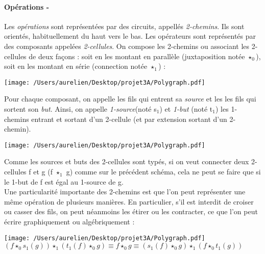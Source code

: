 \documentclass[a4paper,11pt,titlepage]{article}
\newcommand\insPolygraphPDF[1]{\texttt{[image: /Users/aurelien/Desktop/projet3A/Polygraph.pdf]}}
\begin{document}
\paragraph{Op\'{e}rations -}
Les \textit{op\'{e}rations} sont repr\'{e}sent\'{e}es par des circuits, appell\'{e}s \textit{2-chemins}. Ils sont orient\'{e}s, habituellement du haut vers le bas. Les op\'{e}rateurs sont repr\'{e}sent\'{e}s par des composants appel\'{e}es \textit{2-cellules}. On compose les 2-chemins ou associant les 2-cellules de deux fa\c{c}ons : soit en les montant en parall\`{e}le (juxtaposition not\'{e}e $\star_{0}$), soit en les montant en s\'{e}rie (connection not\'{e}e $\star_{1}$) : 
\begin{center}\insPolygraphPDF{2}\end{center}
Pour chaque composant, on appelle les fils qui entrent sa \textit{source} et les les fils qui sortent son \textit{but}. Ainsi, on appelle \textit{1-source}(not\'{e} s$_{1}$) et \textit{1-but} (not\'{e} t$_{1}$) les 1-chemins  entrant et sortant d'un 2-cellule (et par extension sortant d'un 2-chemin).
\begin{center}\insPolygraphPDF{4}\end{center}
Comme les sources et buts des 2-cellules sont typ\'{e}s, si on veut connecter deux 2-cellules f et g (f $\star_{1}$ g) comme sur le pr\'{e}c\'{e}dent sch\'{e}ma, cela ne peut se faire que si le 1-but de f est \'{e}gal au 1-source de g.
\\Une particularit\'{e} importante des 2-chemins est que l'on peut repr\'{e}senter une m\^{e}me op\'{e}ration de plusieurs mani\`{e}res. En particulier, s'il est interdit de croiser ou casser des fils, on peut n\'{e}anmoins les \'{e}tirer ou les contracter, ce que l'on peut \'{e}crire graphiquement ou alg\'{e}briquement :
\begin{center}\insPolygraphPDF{3}
$(f \star_{0} s_{1}(g)) \star_{1} (t_{1}(f) \star_{0} g) \equiv f \star_{0} g \equiv (s_{1}(f) \star_{0} g) \star_{1} (f \star_{0} t_{1}(g))$\end{center}
\end{document}
